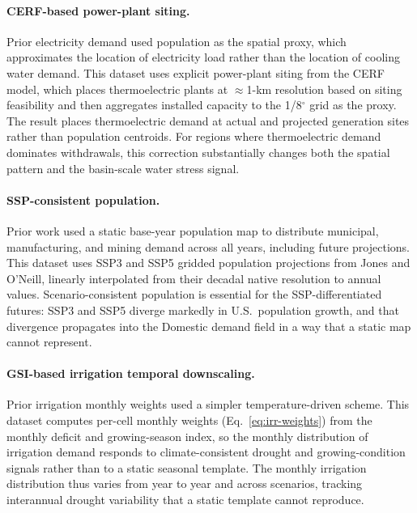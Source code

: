 \documentclass[fleqn,10pt]{wlscirep}
\begin{document}
\paragraph{CERF-based power-plant siting.} Prior electricity demand used population as the spatial proxy, which approximates the location of electricity load rather than the location of cooling water demand. This dataset uses explicit power-plant siting from the CERF model\cite{Vernon2021,Mongird2025CERF}, which places thermoelectric plants at $\approx$1-km resolution based on siting feasibility and then aggregates installed capacity to the 1/8$^{\circ}$ grid as the proxy. The result places thermoelectric demand at actual and projected generation sites rather than population centroids. For regions where thermoelectric demand dominates withdrawals, this correction substantially changes both the spatial pattern and the basin-scale water stress signal.

\paragraph{SSP-consistent population.} Prior work used a static base-year population map to distribute municipal, manufacturing, and mining demand across all years, including future projections. This dataset uses SSP3 and SSP5 gridded population projections from Jones and O'Neill\cite{Jones_2016}, linearly interpolated from their decadal native resolution to annual values. Scenario-consistent population is essential for the SSP-differentiated futures: SSP3 and SSP5 diverge markedly in U.S.~population growth, and that divergence propagates into the Domestic demand field in a way that a static map cannot represent.

\paragraph{GSI-based irrigation temporal downscaling.} Prior irrigation monthly weights used a simpler temperature-driven scheme. This dataset computes per-cell monthly weights (Eq.~\ref{eq:irr-weights}) from the monthly deficit and growing-season index, so the monthly distribution of irrigation demand responds to climate-consistent drought and growing-condition signals rather than to a static seasonal template. The monthly irrigation distribution thus varies from year to year and across scenarios, tracking interannual drought variability that a static template cannot reproduce.
\end{document}
